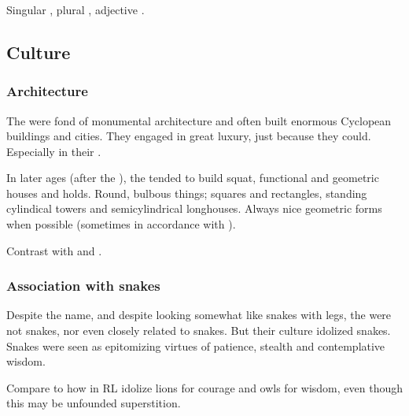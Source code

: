 \subsubsection{\QuilJaar}
Singular \emph{\quiljaar{}}, plural \emph{\quiljaaran{}}, adjective \emph{\quiljaaran{}}. 









\subsection{Culture}





\subsubsection{Architecture}
The \ophidians{} were fond of monumental architecture and often built enormous Cyclopean buildings and cities.
They engaged in great luxury, just because they could. 
Especially in their . 

In later ages (after the \firstbanewar), the \ophidians tended to build squat, functional and geometric houses and holds. 
Round, bulbous things; squares and rectangles, standing cylindical towers and semicylindrical longhouses. 
Always nice geometric forms when possible (sometimes in accordance with ). 

Contrast with  and . 





\subsubsection{Association with snakes}
Despite the name, and despite looking somewhat like snakes with legs, the \ophidians{} were not snakes, nor even closely related to snakes. 
But their culture idolized snakes. 
Snakes were seen as epitomizing virtues of patience, stealth and contemplative wisdom. 

Compare to how \humans{} in RL idolize lions for courage and owls for wisdom, even though this may be unfounded superstition. 

